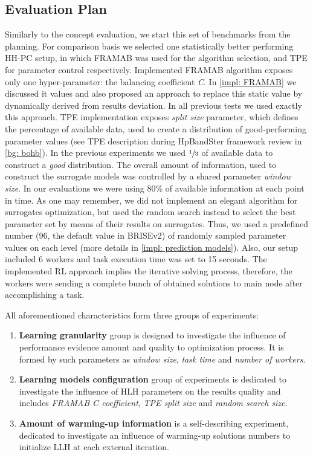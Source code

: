 \subsection{Evaluation Plan}\label{eval:2:plan}
Similarly to the concept evaluation, we start this set of benchmarks from the planning. For comparison basis we selected one statistically better performing HH-PC setup, in which FRAMAB was used for the algorithm selection, and TPE for parameter control respectively. Implemented FRAMAB algorithm exposes only one hyper-parameter: the balancing coefficient \emph{C}. In \cref{impl: FRAMAB} we discussed it values and also proposed an approach to replace this static value by dynamically derived from results deviation. In all previous tests we used exactly this approach. TPE implementation exposes \emph{split size} parameter, which defines the percentage of available data, used to create a distribution of good-performing parameter values (see TPE description during HpBandSter framework review in \cref{bg: bohb}). In the previous experiments we used $\sfrac{1}{3}$ of available data to construct a \emph{good} distribution. The overall amount of information, used to construct the surrogate models was controlled by a shared parameter \emph{window size}. In our evaluations we were using 80\% of available information at each point in time. As one may remember, we did not implement an  elegant algorithm for surrogates optimization, but used the random search instead to select the best parameter set by means of their results on surrogates. Thus, we used a predefined number (96, the default value in BRISEv2) of randomly sampled parameter values on each level (more details in \cref{impl: prediction models}). Also, our setup included 6 workers and task execution time was set to 15 seconds. The implemented RL approach implies the iterative solving process, therefore, the workers were sending a complete bunch of obtained solutions to main node after accomplishing a task. 

All aforementioned characteristics form three groups of experiments:
\begin{enumerate}
	\item \textbf{Learning granularity} group is designed to investigate the influence of performance evidence amount and quality to optimization process. It is formed by such parameters as \emph{window size}, \emph{task time} and \emph{number of workers}.
	
	\item \textbf{Learning models configuration} group of experiments is dedicated to investigate the influence of HLH parameters on the results quality and includes \emph{FRAMAB C coefficient}, \emph{TPE split size} and \emph{random search size}.
	
	\item \textbf{Amount of warming-up information} is a self-describing experiment, dedicated to investigate an influence of warming-up solutions numbers to initialize LLH at each external iteration.
\end{enumerate}

